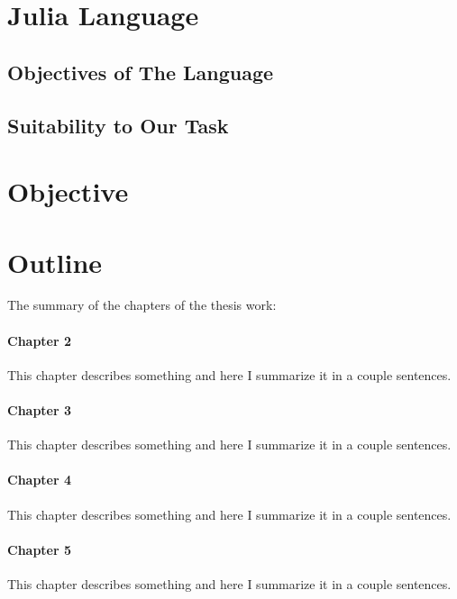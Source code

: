 \section{Julia Language}
\subsection{Objectives of The Language}
\subsection{Suitability to Our Task}

\section{Objective}

\section{Outline}
The summary of the chapters of the thesis work:

\paragraph{Chapter 2} This chapter describes something and here I summarize it in a couple sentences.

\paragraph{Chapter 3} This chapter describes something and here I summarize it in a couple sentences.

\paragraph{Chapter 4} This chapter describes something and here I summarize it in a couple sentences.

\paragraph{Chapter 5} This chapter describes something and here I summarize it in a couple sentences.

\clearpage %